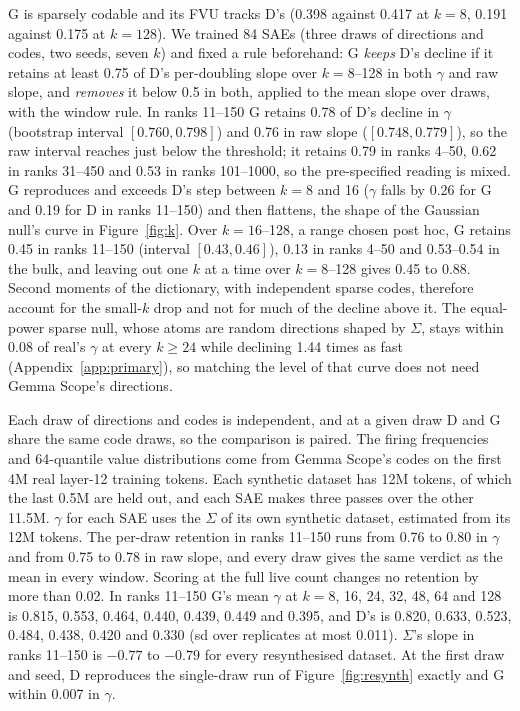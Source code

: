 \documentclass{article}
\newcommand{\Sig}{\Sigma}
\begin{document}
G is sparsely codable and its FVU tracks D's (0.398 against 0.417 at $k=8$, 0.191 against 0.175 at $k=128$). We trained 84 SAEs (three draws of directions and codes, two seeds, seven $k$) and fixed a rule beforehand: G \emph{keeps} D's decline if it retains at least 0.75 of D's per-doubling slope over $k=8$--128 in both $\gamma$ and raw slope, and \emph{removes} it below 0.5 in both, applied to the mean slope over draws, with the window rule. In ranks 11--150 G retains 0.78 of D's decline in $\gamma$ (bootstrap interval $[0.760, 0.798]$) and 0.76 in raw slope ($[0.748, 0.779]$), so the raw interval reaches just below the threshold; it retains 0.79 in ranks 4--50, 0.62 in ranks 31--450 and 0.53 in ranks 101--1000, so the pre-specified reading is mixed. G reproduces and exceeds D's step between $k=8$ and 16 ($\gamma$ falls by 0.26 for G and 0.19 for D in ranks 11--150) and then flattens, the shape of the Gaussian null's curve in Figure~\ref{fig:k}. Over $k=16$--128, a range chosen post hoc, G retains 0.45 in ranks 11--150 (interval $[0.43, 0.46]$), 0.13 in ranks 4--50 and 0.53--0.54 in the bulk, and leaving out one $k$ at a time over $k=8$--128 gives 0.45 to 0.88. Second moments of the dictionary, with independent sparse codes, therefore account for the small-$k$ drop and not for much of the decline above it. The equal-power sparse null, whose atoms are random directions shaped by $\Sig$, stays within 0.08 of real's $\gamma$ at every $k \ge 24$ while declining 1.44 times as fast (Appendix~\ref{app:primary}), so matching the level of that curve does not need Gemma Scope's directions.

Each draw of directions and codes is independent, and at a given draw D and G share the same code draws, so the comparison is paired. The firing frequencies and 64-quantile value distributions come from Gemma Scope's codes on the first 4M real layer-12 training tokens. Each synthetic dataset has 12M tokens, of which the last 0.5M are held out, and each SAE makes three passes over the other 11.5M. $\gamma$ for each SAE uses the $\Sig$ of its own synthetic dataset, estimated from its 12M tokens. The per-draw retention in ranks 11--150 runs from 0.76 to 0.80 in $\gamma$ and from 0.75 to 0.78 in raw slope, and every draw gives the same verdict as the mean in every window. Scoring at the full live count changes no retention by more than 0.02. In ranks 11--150 G's mean $\gamma$ at $k=8$, 16, 24, 32, 48, 64 and 128 is 0.815, 0.553, 0.464, 0.440, 0.439, 0.449 and 0.395, and D's is 0.820, 0.633, 0.523, 0.484, 0.438, 0.420 and 0.330 (sd over replicates at most 0.011). $\Sig$'s slope in ranks 11--150 is $-0.77$ to $-0.79$ for every resynthesised dataset. At the first draw and seed, D reproduces the single-draw run of Figure~\ref{fig:resynth} exactly and G within 0.007 in $\gamma$.
\end{document}
